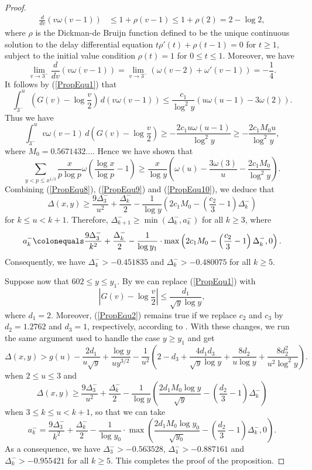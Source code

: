 \documentclass[12pt,reqno]{amsart}
\begin{document}
\begin{proof}
\begin{align*}
	\frac{d}{dv}(v\omega(v-1))&\le 1+\rho(v-1)\le1+\rho(2)=2-\log2,
\end{align*}
where $\rho$ is the Dickman-de Bruijn function defined to be the unique continuous solution to the delay differential equation $t\rho'(t)+\rho(t-1)=0$ for $t\ge1$, subject to the initial value condition $\rho(t)=1$ for $0\le t\leq 1$. Moreover, we have
\[\lim\limits_{v\to3^-}\frac{d}{dv}(v\omega(v-1))=\lim\limits_{v\to3^-}\left(\omega(v-2)+\omega'(v-1)\right)=-\frac{1}{4}.\]
It follows by (\ref{PropEqu1}) that
\[\int_{3^-}^{u}\left(G(v)-\log\frac{v}{2}\right)\,d(v\omega(v-1))\le \frac{c_1}{\log^2y}\left(u\omega(u-1)-3\omega(2)\right).\]
Thus we have
\[\int_{3^-}^{u}v\omega(v-1)\,d\left(G(v)-\log\frac{v}{2}\right)\ge -\frac{2c_1u\omega(u-1)}{\log^2y}\ge -\frac{2c_1M_0u}{\log^2y},\]
where $M_0=0.5671432...$. Hence we have shown that
\begin{equation}\label{PropEqu10}
	\sum_{y<p\le x^{1/3}}\frac{x}{p\log p}\omega\left(\frac{\log x}{\log p}-1\right)\ge\frac{x}{\log y}\left(\omega(u)-\frac{3\omega(3)}{u}- \frac{2c_1M_0}{\log^2 y}\right).
\end{equation}
Combining (\ref{PropEqu8}), (\ref{PropEqu9}) and (\ref{PropEqu10}), we deduce that
\[\Delta(x,y)\ge\frac{9\Delta_3^-}{u^2}+\frac{\Delta_k^-}{2}-\frac{1}{\log y}\left(2c_1M_0-\left(\frac{c_2}{3}-1\right)\Delta_k^-\right)\]
for $k\le u<k+1$. Therefore, $\Delta_{k+1}^-\ge \min(\Delta_k^-,a_k^-)$ for all $k\ge3$, where
\[a_k^-\colonequals\frac{9\Delta_3^-}{k^2}+\frac{\Delta_k^-}{2}-\frac{1}{\log y_1}\cdot\max\left(2c_1M_0-\left(\frac{c_2}{3}-1\right)\Delta_k^-,0\right).\]
Consequently, we have $\Delta_4^->-0.451835$ and $\Delta_k^->-0.480075$ for all $k\ge5$.
\par Suppose now that $602\le y\le y_1$. By \cite[Theorem 20]{RS} we can replace (\ref{PropEqu1}) with
\[\left|G(v)-\log\frac{v}{2}\right|\le\frac{d_1}{\sqrt{y}\log y},\]
where $d_1=2$. Moreover, (\ref{PropEqu2}) remains true if we replace $c_2$ and $c_3$ by $d_2=1.2762$ and $d_3=1$, respectively, according to \cite[Corollary 5.2]{D}. With these changes, we run the same argument used to handle the case $y\ge y_1$ and get
\[\Delta(x,y)>g(u)-\frac{2d_1}{u\sqrt{y}}+\frac{\log y}{uy^{3/2}}-\frac{1}{u^2}\left(2-d_3+\frac{4d_1d_3}{\sqrt{y}\log y}+\frac{8d_2}{u\log y}+\frac{8d_2^2}{u^2\log^2 y}\right).\]
when $2\le u\le 3$ and 
\[\Delta(x,y)\ge\frac{9\Delta_3^-}{u^2}+\frac{\Delta_k^-}{2}-\frac{1}{\log y}\left(\frac{2d_1M_0\log y}{\sqrt{y}}-\left(\frac{d_2}{3}-1\right)\Delta_k^-\right)\]
when $3\le k\le u<k+1$, so that we can take
\[a_k^-=\frac{9\Delta_3^-}{k^2}+\frac{\Delta_k^-}{2}-\frac{1}{\log y_0}\cdot\max\left(\frac{2d_1M_0\log y_0}{\sqrt{y_0}}-\left(\frac{d_2}{3}-1\right)\Delta_k^-,0\right).\]
As a consequence, we have $\Delta_3^->-0.563528$, $\Delta_4^->-0.887161$ and $\Delta_k^->-0.955421$ for all $k\ge5$. This completes the proof of the proposition.
\end{proof}
\end{document}
